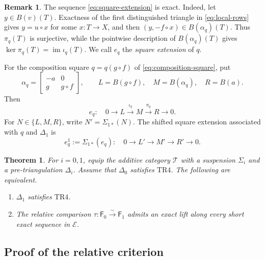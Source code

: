 \documentclass[a4paper,11pt,reqno]{amsart}
\newtheorem{theorem}{Theorem}[section]
\theoremstyle{definition}
\newtheorem{remark}[remark]{Remark}
\theoremstyle{plain}
\numberwithin{equation}{section}
\newcommand{\T}{\mathcal T}
\begin{document}
\begin{remark}
\label{rem:square-extension}
The sequence \eqref{eq:square-extension} is exact.  Indeed, let
\(y\in B(v)(T)\).  Exactness of the first distinguished triangle in
\eqref{eq:local-rows} gives \(y=u\circ x\) for some \(x:T\to X\), and then
\((y,-f\circ x)\in B(\alpha_q)(T)\).  Thus \(\pi_q(T)\) is surjective, while
the pointwise description of \(B(\alpha_q)(T)\) gives
\(\ker\pi_q(T)=\operatorname{im}\iota_q(T)\).  We call \(e_q\) the
\emph{square extension} of \(q\).

For the composition square \(q=q(g\circ f)\) of
\eqref{eq:composition-square}, put
\[
 \alpha_q=
 \begin{bmatrix}-a&0\\ g&g\circ f\end{bmatrix},
 \qquad
 L=B(g\circ f),\quad M=B(\alpha_q),\quad R=B(a).
\]
Then
\begin{equation}
\label{eq:relative-composition-extension}
 e_q:\quad
 0\longrightarrow L\xrightarrow{\iota_q}M
 \xrightarrow{\pi_q}R\longrightarrow0.
\end{equation}
For \(N\in\{L,M,R\}\), write \(N'=\Sigma_{1*}(N)\).  The shifted square
extension associated with \(q\) and \(\Delta_1\) is
\begin{equation}
\label{eq:shifted-composition-extension}
 e_q^1:=\Sigma_{1*}(e_q):\quad
 0\longrightarrow L'\longrightarrow M'\longrightarrow R'
 \longrightarrow0.
\end{equation}
\end{remark}

\begin{theorem}
\label{thm:relative-heller-criterion}
For \(i=0,1\), equip the additive category \(\T\) with a suspension
\(\Sigma_i\) and a pre-triangulation \(\Delta_i\).  Assume that
\(\Delta_0\) satisfies
\(\mathrm{TR4}\).  The following are equivalent.
\begin{enumerate}[label=\textup{(\roman*)}]
 \item \(\Delta_1\) satisfies \(\mathrm{TR4}\).
 \item The relative comparison
       \(\tau:\mathsf F_0\xrightarrow{\sim}\mathsf F_1\) admits an exact
       lift along every short exact sequence in \(\mathcal E\).
\end{enumerate}
\end{theorem}

\subsection{Proof of the relative criterion}
\end{document}
